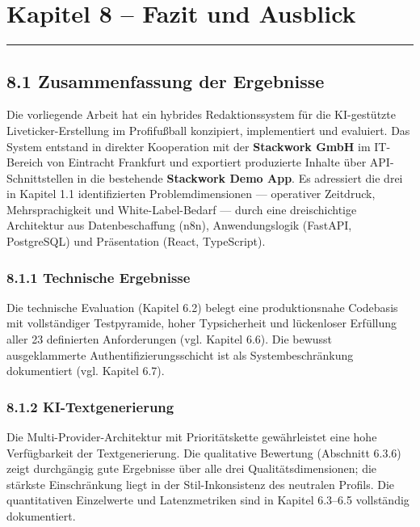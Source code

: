 \section{Kapitel 8 -- Fazit und
Ausblick}\label{kapitel-8-fazit-und-ausblick}

\begin{center}\rule{0.5\linewidth}{0.5pt}\end{center}

\subsection{8.1 Zusammenfassung der
Ergebnisse}\label{zusammenfassung-der-ergebnisse}

Die vorliegende Arbeit hat ein hybrides Redaktionssystem für die
KI-gestützte Liveticker-Erstellung im Profifußball konzipiert,
implementiert und evaluiert. Das System entstand in direkter Kooperation
mit der \textbf{Stackwork GmbH} im IT-Bereich von Eintracht Frankfurt
und exportiert produzierte Inhalte über API-Schnittstellen in die
bestehende \textbf{Stackwork Demo App}. Es adressiert die drei in
Kapitel 1.1 identifizierten Problemdimensionen --- operativer Zeitdruck,
Mehrsprachigkeit und White-Label-Bedarf --- durch eine dreischichtige
Architektur aus Datenbeschaffung (n8n), Anwendungslogik (FastAPI,
PostgreSQL) und Präsentation (React, TypeScript).

\subsubsection{8.1.1 Technische Ergebnisse}\label{technische-ergebnisse}

Die technische Evaluation (Kapitel 6.2) belegt eine produktionsnahe
Codebasis mit vollständiger Testpyramide, hoher Typsicherheit und
lückenloser Erfüllung aller 23 definierten Anforderungen (vgl. Kapitel
6.6). Die bewusst ausgeklammerte Authentifizierungsschicht ist als
Systembeschränkung dokumentiert (vgl. Kapitel 6.7).

\subsubsection{8.1.2 KI-Textgenerierung}\label{ki-textgenerierung}

Die Multi-Provider-Architektur mit Prioritätskette gewährleistet eine
hohe Verfügbarkeit der Textgenerierung. Die qualitative Bewertung
(Abschnitt 6.3.6) zeigt durchgängig gute Ergebnisse über alle drei
Qualitätsdimensionen; die stärkste Einschränkung liegt in der
Stil-Inkonsistenz des neutralen Profils. Die quantitativen Einzelwerte
und Latenzmetriken sind in Kapitel 6.3--6.5 vollständig dokumentiert.

